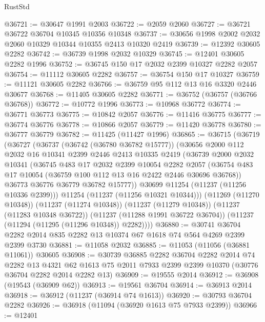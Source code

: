 \begin{lexlean}{RustStd}
\begin{coremodule}
@36721 := @30647 @1991 @2003
@36722 := @2059 @2060
@36727 := @36721 @36722 @36704 @10345 @10356 @10348
@36737 := @30656 @1998 @2002 @2032 @2060 @10329 @10344 @10355 @2413 @10320 @2419
@36739 := @12392 @30605 @2282
@36742 := @36739 @1998 @2032 @10329
@36745 := @12401 @30605 @2282 @1996
@36752 := @36745 @150 @17 @2032 @2399 @10327 @2282 @2057
@36754 := @11112 @30605 @2282
@36757 := @36754 @150 @17 @10327
@36759 := @11121 @30605 @2282
@36766 := @36759 @95 @112 @13 @16 @3320 @2446 @30677
@36768 := @11405 @30605 @2282
@36771 := @36752 (@36757 (@36766 @36768))
@36772 := @10772 @1996
@36773 := @10968 @36772
@36774 := @36771 @36773
@36775 := @10842 @2057
@36776 := @11416 @36775
@36777 := @36774 @36776
@36778 := @10866 @2057
@36779 := @11420 @36778
@36780 := @36777 @36779
@36782 := @11425 (@11427 @1996)
@36865 := @36715
    (@36719
      (@36727
        (@36737
          (@36742 (@36780 @36782 @15777))
          (@30656
            @2000
            @112
            @2032
            @16
            @10341
            @2399
            @2446
            @2413
            @10335
            @2419
            (@36739
              @2000
              @2032
              @10341
              (@36745
                @483
                @17
                @2032
                @2399
                @10054
                @2282
                @2057
                (@36754 @483 @17 @10054 (@36759 @100 @112 @13 @16 @2422 @2446 @30696 @36768))
                @36773
                @36776
                @36779
                @36782
                @15777))
            @30699
            @11254
            (@11237 (@11256 @10336 @2399)))
          @11254
          (@11237 (@11256 @10321 @10344)))
        (@11269 (@11270 @10348))
        (@11237 (@11274 @10348))
        (@11237 (@11279 @10348))
        (@11237 (@11283 @10348 @36722))
        (@11237 (@11288 @1991 @36722 @36704))
        (@11237 (@11294 (@11295 (@11296 @10348)) @2282))))
@36880 := @30741 @36704 @2282 @2014 @835 @2282 @13 @10374 @67 @1618 @74 @564 @4269 @2399 @2399 @3730
@36881 := @11058 @2032
@36885 := @11053 (@11056 (@36881 @11061)) @30605
@36908 := @30739
    @36885
    @2282
    @36704
    @2282
    @2014
    @74
    @2282
    @13
    @4321
    @62
    @1613
    @75
    @2011
    @7933
    @2399
    @2399
    @10370
    (@30776 @36704 @2282 @2014 @2282 @13)
@36909 := @19555 @2014
@36912 := @36908 (@19543 (@36909 @62))
@36913 := @19561 @36704
@36914 := @36913 @2014
@36918 := @36912 (@11237 (@36914 @74 @1613))
@36920 := @30793 @36704 @2282
@36926 := @36918 (@11094 (@36920 @1613 @75 @7933 @2399))
@36966 := @12401

\end{coremodule}
\end{lexlean}
